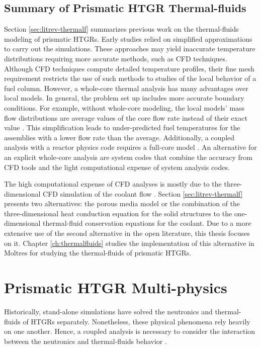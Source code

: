 \subsection{Summary of Prismatic HTGR Thermal-fluids}

Section \ref{sec:litrev-thermalf} summarizes previous work on the thermal-fluids modeling of prismatic HTGRs.
Early studies relied on simplified approximations to carry out the simulations.
These approaches may yield inaccurate temperature distributions requiring more accurate methods, such as CFD techniques.
Although CFD techniques compute detailed temperature profiles, their fine mesh requirement restricts the use of such methods to studies of the local behavior of a fuel column.
However, a whole-core thermal analysis has many advantages over local models.
In general, the problem set up includes more accurate boundary conditions.
For example, without whole-core modeling, the local models' mass flow distributions are average values of the core flow rate instead of their exact value \cite{huning_novel_2016}.
This simplification leads to under-predicted fuel temperatures for the assemblies with a lower flow rate than the average.
Additionally, a coupled analysis with a reactor physics code requires a full-core model \cite{tak_practical_2012}.
An alternative for an explicit whole-core analysis are system codes that combine the accuracy from CFD tools and the light computational expense of system analysis codes.

The high computational expense of CFD analyses is mostly due to the three-dimensional CFD simulation of the coolant flow \cite{travis_thermalhydraulics_2013}.
Section \ref{sec:litrev-thermalf} presents two alternatives: the porous media model or the combination of the three-dimensional heat conduction equation for the solid structures to the one-dimensional thermal-fluid conservation equations for the coolant.
Due to a more extensive use of the second alternative in the open literature, this thesis focuses on it.
Chapter \ref{ch:thermalfluids} studies the implementation of this alternative in Moltres for studying the thermal-fluids of prismatic HTGRs.

\section{Prismatic HTGR Multi-physics}
\label{sec:litreview-multi}

Historically, stand-alone simulations have solved the neutronics and thermal-fluids of HTGRs separately.
Nonetheless, these physical phenomena rely heavily on one another.
Hence, a coupled analysis is necessary to consider the interaction between the neutronics and thermal-fluids behavior \cite{tak_cappgamma_2016}.

